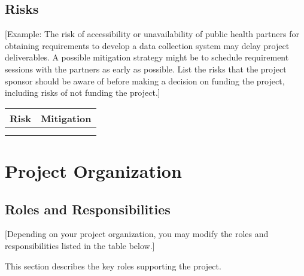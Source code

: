 \documentclass[a4paper, 11pt]{article}
\begin{document}
\hypertarget{risks}{%
\subsection{Risks}\label{risks}}

{[}Example: The risk of accessibility or unavailability of public health
partners for obtaining requirements to develop a data collection system
may delay project deliverables. A possible mitigation strategy might be
to schedule requirement sessions with the partners as early as possible.
List the risks that the project sponsor should be aware of before making
a decision on funding the project, including risks of not funding the
project.{]}

\begin{longtable}[]{@{}ll@{}}
\toprule
\textbf{Risk} & \textbf{Mitigation}\tabularnewline
\midrule
\endhead
&\tabularnewline
&\tabularnewline
\bottomrule
\end{longtable}

\hypertarget{project-organization}{%
\section{Project Organization}\label{project-organization}}

\hypertarget{roles-and-responsibilities}{%
\subsection{Roles and
Responsibilities}\label{roles-and-responsibilities}}

{[}Depending on your project organization, you may modify the roles and
responsibilities listed in the table below.{]}

This section describes the key roles supporting the project.
\end{document}
